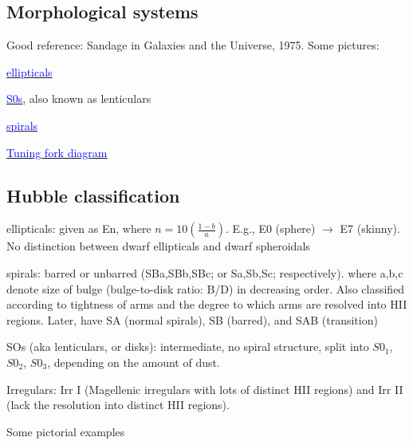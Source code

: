 \documentclass[12pt]{article}
\begin{document}
\subsection*{Morphological systems}
Good reference: Sandage in Galaxies and the Universe, 1975.
Some pictures:
\begin{itemize*}
    \item \href{http://astronomy.nmsu.edu/holtz/a555/html/diagrams/a616/ellips.htm}
        {\textcolor{blue}{ellipticals}}
    \item \href{http://astronomy.nmsu.edu/holtz/a555/html/diagrams/a616/s0.htm}
        {\textcolor{blue}{S0s}}, also known as lenticulars
    \item \href{http://astronomy.nmsu.edu/holtz/a555/html/diagrams/a616/spirals.htm}
        {\textcolor{blue}{spirals}}
    \item \href{http://astronomy.as.virginia.edu}
        {\textcolor{blue}{Tuning fork diagram}}
\end{itemize*}

\subsection*{Hubble classification}
\begin{itemize*}
           \item ellipticals: given as En, where $n = 10(\frac{1-b}{a})$.
              E.g., E0 (sphere) $\rightarrow$ E7 (skinny).
              No distinction between dwarf ellipticals and dwarf spheroidals
           \item spirals: barred or unbarred (SBa,SBb,SBc; or Sa,Sb,Sc;
              respectively).
              where a,b,c denote size of bulge (bulge-to-disk ratio: B/D)
              in decreasing order. Also classified according to tightness of
              arms and the degree to which arms are resolved into HII regions.
              Later, have SA (normal spirals), SB (barred), and SAB (transition)
            \item SOs (aka lenticulars, or disks): intermediate, no spiral
                structure, split into $S0_1$, $S0_2$, $S0_3$, depending on the
                amount of dust.
            \item Irregulars: Irr I (Magellenic irregulars with lots of
                 distinct HII regions) and Irr II (lack the resolution into
                distinct HII regions).
            \item Some pictorial examples
\end{itemize*}
\end{document}
